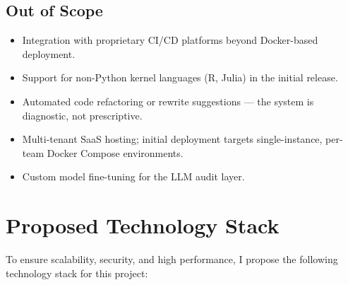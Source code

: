 \documentclass[11pt, a4paper]{article}
\begin{document}
\subsection*{Out of Scope}

\begin{itemize}
  \item Integration with proprietary CI/CD platforms beyond Docker-based deployment.
  \item Support for non-Python kernel languages (R, Julia) in the initial release.
  \item Automated code refactoring or rewrite suggestions --- the system is
    diagnostic, not prescriptive.
  \item Multi-tenant SaaS hosting; initial deployment targets single-instance,
    per-team Docker Compose environments.
  \item Custom model fine-tuning for the LLM audit layer.
\end{itemize}

\section{Proposed Technology Stack}

To ensure scalability, security, and high performance, I propose the following
technology stack for this project:
\end{document}
